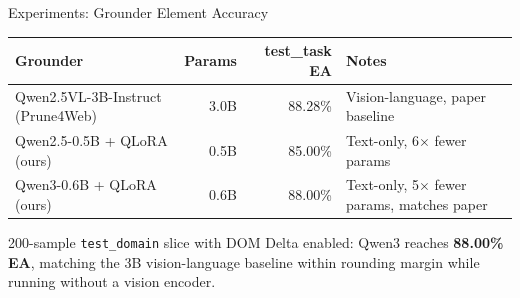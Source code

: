 \begin{frame}{Experiments: Grounder Element Accuracy}
  \begin{center}
    \scriptsize
    \begin{tabular}{l r r l}
      \toprule
      \textbf{Grounder} & \textbf{Params} & \textbf{test\_task EA} & \textbf{Notes} \\
      \midrule
      Qwen2.5VL-3B-Instruct (Prune4Web) & 3.0B & 88.28\% & Vision-language, paper baseline \\
      Qwen2.5-0.5B + QLoRA (ours) & 0.5B & 85.00\% & Text-only, 6$\times$ fewer params \\
      Qwen3-0.6B + QLoRA (ours) & 0.6B & 88.00\% & Text-only, 5$\times$ fewer params, matches paper \\
      \bottomrule
    \end{tabular}
  \end{center}

  \vskip0.5cm
  200-sample \texttt{test\_domain} slice with DOM Delta enabled: Qwen3 reaches \textbf{88.00\% EA}, matching the 3B vision-language baseline within rounding margin while running without a vision encoder.
\end{frame}
